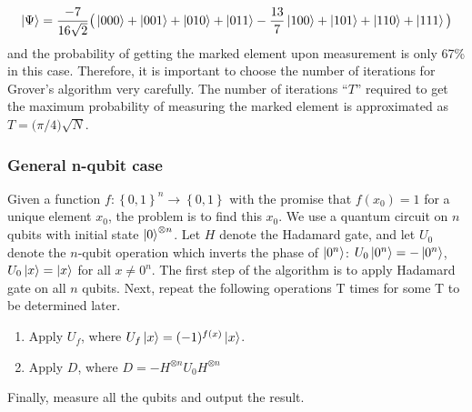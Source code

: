 \begin{align}
\left\vert{\Psi}\right\rangle=\dfrac{-7}{16\sqrt{2}}\big(\left\vert{000}\right\rangle+\left\vert{001}\right\rangle+\left\vert{010}\right\rangle+\left\vert{011}\right\rangle-\frac{13}{7}\left\vert{100}\right\rangle+\left\vert{101}\right\rangle+\left\vert{110}\right\rangle+\left\vert{111}\right\rangle\big)    
\end{align}
and the probability of getting the marked element upon measurement is only 67\% in this case. Therefore, it is important to choose the number of iterations for Grover's algorithm very carefully. The number of iterations ``$T$'' required to get the maximum probability of measuring the marked element is approximated as $T=\big(\pi\big/4)\sqrt{N}$.

\subsubsection{General n-qubit case}

Given a function $f: \left\{0,1\right\}^n \rightarrow \left\{0,1\right\}$ with the promise that $f(x_0) = 1$ for a unique element $x_0$, the problem is to find this $x_0$. We use a quantum circuit on $n$ qubits with initial state $\left\vert{0}\right\rangle^{\otimes n}$.  Let $H$ denote the Hadamard gate, and let $U_0$ denote the $n$-qubit operation which inverts the phase of $\left\vert{0^n}\right\rangle$: $U_0\left\vert{0^n}\right\rangle = -\left\vert{0^n}\right\rangle$, $U_0\left\vert{x}\right\rangle = \left\vert{x}\right\rangle$ for all $x \neq 0^n$. The first step of the algorithm is to apply Hadamard gate on all $n$ qubits. Next, repeat the following operations T times for some T to be determined later.

\begin{enumerate}
\item Apply $U_f$, where $U_f\left\vert{x}\right\rangle = (-1)^{f(x)}\left\vert{x}\right\rangle$.
\item Apply $D$, where $D = -H^{\otimes n}U_0H^{\otimes n}$
\end{enumerate} 
Finally, measure all the qubits and output the result.\\

